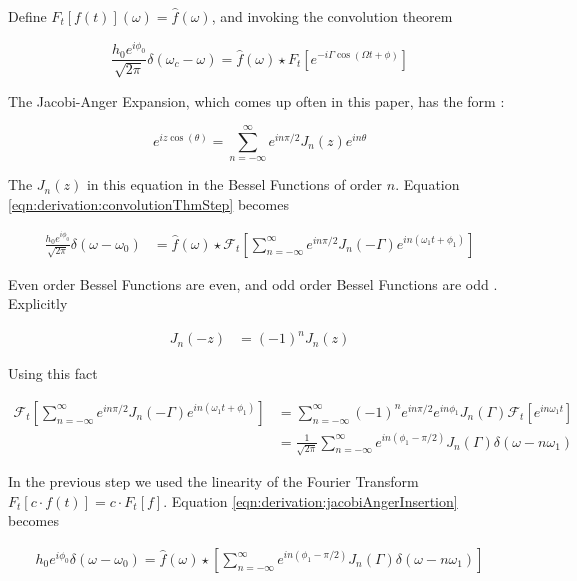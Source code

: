\documentclass[onecolumn, groupedaddress, 10pt]{revtex4-1}
\begin{document}
Define $F_t[f(t)](\omega) = \hat{f}(\omega)$, and invoking the convolution theorem

\begin{equation}
\label{eqn:derivation:convolutionThmStep}
\frac{h_0 e^{i\phi_0}}{\sqrt{2\pi}} \delta (\omega_c - \omega) = \hat{f}(\omega) \star F_t \left[ e^{-i\Gamma \cos (\Omega t + \phi)} \right]
\end{equation}

The Jacobi-Anger Expansion, which comes up often in this paper, has the form \cite{}:

\begin{equation}
\label{eqn:jacobiAnger}
e^{iz\cos (\theta)} = \sum_{n=-\infty}^{\infty} e^{in\pi/2} J_n(z) e^{in\theta}
\end{equation}

The $J_n(z)$ in this equation in the Bessel Functions of order $n$.  Equation \ref{eqn:derivation:convolutionThmStep} becomes

\begin{align}
\label{eqn:derivation:jacobiAngerInsertion}
\frac{h_0 e^{i\phi_0}}{\sqrt{2\pi}} \delta (\omega - \omega_0)
&=
\hat{f}(\omega)
\star \mathcal{F}_t \left[ \sum_{n=-\infty}^{\infty} e^{in\pi/2} J_n(-\Gamma) e^{in(\omega_1 t + \phi_1)} \right]
\end{align}

Even order Bessel Functions are even, and odd order Bessel Functions are odd \cite{}.  Explicitly

\begin{align}
	J_n(-z) &= (-1)^n J_n(z)
\end{align}

Using this fact

\begin{align}
\mathcal{F}_t \left[ \sum_{n=-\infty}^{\infty} e^{in\pi/2} J_n(-\Gamma) e^{in(\omega_1 t + \phi_1)} \right]
&= \sum_{n=-\infty}^{\infty} (-1)^n e^{in\pi/2} e^{in\phi_1} J_n(\Gamma) \mathcal{F}_t \left[e^{in\omega_1 t} \right]	 \\
&= \frac{1}{\sqrt{2\pi}}\sum_{n=-\infty}^{\infty} e^{in(\phi_1 - \pi/2)} J_n(\Gamma) \delta (\omega - n\omega_1)
\end{align}

In the previous step we used the linearity of the Fourier Transform $F_t[c \cdot f(t)] = c \cdot F_t[f]$.  Equation \ref{eqn:derivation:jacobiAngerInsertion} becomes

\begin{align}
h_0 e^{i\phi_0} \delta (\omega - \omega_0) = \hat{f}(\omega)
\star
\left[ \sum_{n=-\infty}^{\infty} e^{in(\phi_1 - \pi/2)} J_n(\Gamma) \delta (\omega - n\omega_1) \right]
\end{align}
\end{document}
